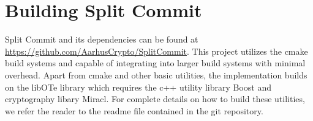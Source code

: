 \section{Building Split Commit}

Split Commit and its dependencies can be found at \url{https://github.com/AarhusCrypto/SplitCommit}. This project utilizes the cmake build systems and capable of integrating into larger build systems with minimal overhead. Apart from cmake and other basic utilities, the implementation builds on the libOTe\cite{libOTe} library which requires the c++ utility library Boost\cite{boost} and cryptography libary Miracl\cite{miracl}. For complete details on how to build these utilities, we refer the reader to the readme file contained in the git repository.

